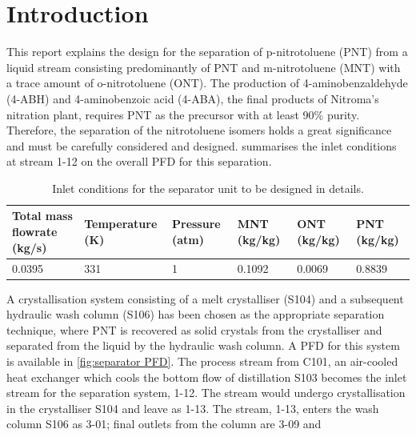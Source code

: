 \section{Introduction}

This report explains the design for the separation of p-nitrotoluene (PNT) from a liquid stream consisting predominantly of PNT and m-nitrotoluene (MNT) with a trace amount of o-nitrotoluene (ONT). The production of 4-aminobenzaldehyde (4-ABH) and 4-aminobenzoic acid (4-ABA), the final products of Nitroma's nitration plant, requires PNT as the precursor with at least 90\% purity. Therefore, the separation of the nitrotoluene isomers holds a great significance and must be carefully considered and designed.  summarises the inlet conditions at stream 1-12 on the overall PFD for this separation. 

\begin{table}[h] 
\centering
\caption{Inlet conditions for the separator unit to be designed in details.}
\begin{tabular}{@{}l|l|l|l|l|l@{}}
\toprule
\textbf{Total mass flowrate (kg/s)}  & \textbf{Temperature (K)}  & \textbf{Pressure (atm)} & \textbf{MNT (kg/kg)} & \textbf{ONT (kg/kg)} & \textbf{PNT (kg/kg)}   \\ \midrule
0.0395  & 331 &  1 & 0.1092 & 0.0069  &   0.8839 \\ \bottomrule
\end{tabular}
\label{tab:inlet crystalliser}
\end{table}

A crystallisation system consisting of a melt crystalliser (S104) and a subsequent hydraulic wash column (S106) has been chosen as the appropriate separation technique, where PNT is recovered as solid crystals from the crystalliser and separated from the liquid by the hydraulic wash column. A PFD for this system is available in \cref{fig:separator PFD}. The process stream from C101, an air-cooled heat exchanger which cools the bottom flow of distillation S103 becomes the inlet stream for the separation system, 1-12. The stream would undergo crystallisation in the crystalliser S104 and leave as 1-13. The stream, 1-13, enters the wash column S106 as 3-01; final outlets from the column are 3-09 and 


